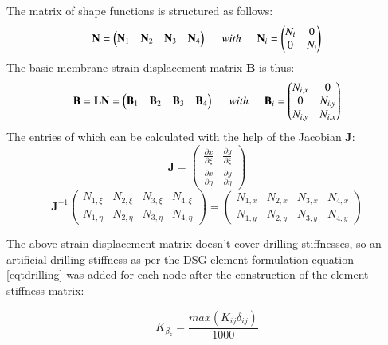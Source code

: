 The matrix of shape functions is structured as follows:
\begin{equation}
\mathbf{N}=  \begin{pmatrix}
\mathbf{N}_1 & \mathbf{N}_2 & \mathbf{N}_3 & \mathbf{N}_4
\end{pmatrix}
\hspace{5mm}
with
\hspace{5mm}
\mathbf{N}_i=  \begin{pmatrix}
{N}_i & 0\\
0& N_i
\end{pmatrix}
\label{eqApp1_4}
\end{equation}
The basic membrane strain displacement matrix $\mathbf{B}$ is thus:
\begin{equation}
\mathbf{B}=  \mathbf{L} \mathbf{N} = \begin{pmatrix}
\mathbf{B}_1 & \mathbf{B}_2 & \mathbf{B}_3 & \mathbf{B}_4
\end{pmatrix}
\hspace{5mm}
with
\hspace{5mm}
\mathbf{B}_i=  \begin{pmatrix}
{N}_{i,x} & 0\\
0& {N}_{i,y}\\
{N}_{i,y} & {N}_{i,x}
\end{pmatrix}
\label{eqApp1_5}
\end{equation}
The entries of which can be calculated with the help of the Jacobian $\mathbf{J}$:
\begin{equation}
\mathbf{J}=  \begin{pmatrix}
\frac{\partial x}{\partial \xi} & \frac{\partial y}{\partial \xi} \\
\frac{\partial x}{\partial \eta} & \frac{\partial y}{\partial \eta}
\end{pmatrix}
\label{eqApp1_6}
\end{equation}
\begin{equation}
\mathbf{J}^{-1} 
\begin{pmatrix}
{N}_{1,\xi} & {N}_{2,\xi} & {N}_{3,\xi} & {N}_{4,\xi}\\
{N}_{1,\eta} & {N}_{2,\eta} & {N}_{3,\eta} & {N}_{4,\eta}
\end{pmatrix}
=
\begin{pmatrix}
{N}_{1,x} & {N}_{2,x} & {N}_{3,x} & {N}_{4,x}\\
{N}_{1,y} & {N}_{2,y} & {N}_{3,y} & {N}_{4,y}
\end{pmatrix}
\label{eqApp1_7}
\end{equation}

The above strain displacement matrix doesn't cover drilling stiffnesses, so an artificial drilling stiffness as per the DSG element formulation equation \ref{eqtdrilling} was added for each node after the construction of the element stiffness matrix:

\begin{equation} 
K_{\beta_z} =  \frac{max(K_{ij}\delta_{ij})}{1000}
\label{eqtdrilling1}
\end{equation}